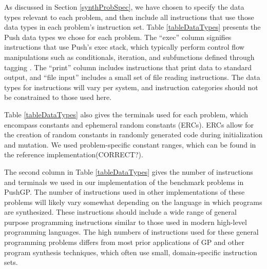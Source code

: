 \documentclass{sig-alternate}
\begin{document}
As discussed in Section \ref{synthProbSpec}, we have chosen to specify the data types relevant to each problem, and then include all instructions that use those data types in each problem's instruction set. Table \ref{tableDataTypes} presents the Push data types we chose for each problem. The ``exec'' column signifies instructions that use Push's exec stack, which typically perform control flow manipulations such as conditionals, iteration, and subfunctions defined through tagging \cite{Spector:2011:GECCO}. The ``print'' column includes instructions that print data to standard output, and ``file input'' includes a small set of file reading instructions. The data types for instructions will vary per system, and instruction categories should not be constrained to those used here.

Table \ref{tableDataTypes} also gives the terminals used for each problem, which encompass constants and ephemeral random constants (ERCs). ERCs allow for the creation of random constants in randomly generated code during initialization and mutation. We used problem-specific constant ranges, which can be found in the reference implementation\footnotemark[1] (CORRECT?).

The second column in Table \ref{tableDataTypes} gives the number of instructions and terminals we used in our implementation of the benchmark problems in PushGP. The number of instructions used in other implementations of these problems will likely vary somewhat depending on the language in which programs are synthesized. These instructions should include a wide range of general purpose programming instructions similar to those used in modern high-level programming languages. The high numbers of instructions used for these general programming problems differs from most prior applications of GP and other program synthesis techniques, which often use small, domain-specific instruction sets.
\end{document}
